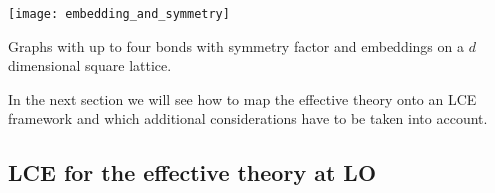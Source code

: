 \begin{table}[ht]
  \begin{center}
    \texttt{[image: embedding\_and\_symmetry]}
  \end{center}
  \caption{Graphs with up to four bonds with symmetry factor and embeddings
  on a $d$ dimensional square lattice.}
  \label{tab:graphs_embeddings}
\end{table}

In the next section we will see how to map the effective theory onto an LCE
framework and which additional considerations have to be taken into account.

\subsection{LCE for the effective theory at LO}


